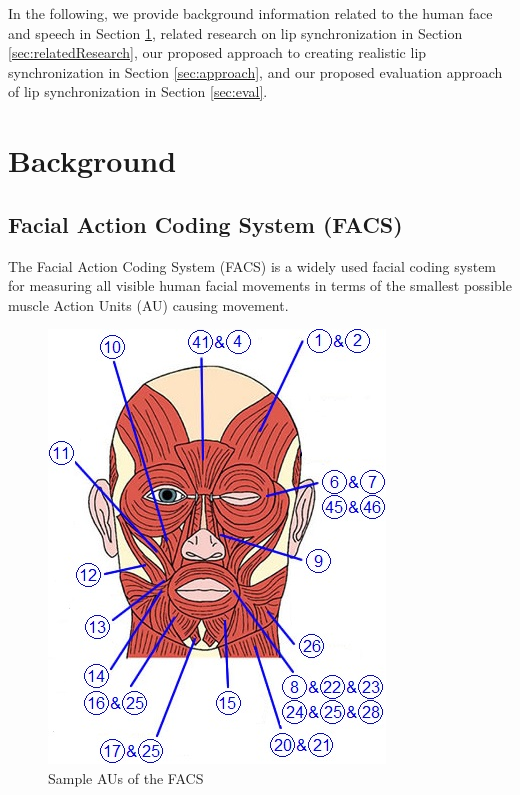 \documentclass[12pt]{article}
\begin{document}
In the following, we provide background information related to the human face and speech in Section \ref{sec:background}, related research on lip synchronization in Section \ref{sec:relatedResearch}, our proposed approach to creating realistic lip synchronization in Section \ref{sec:approach}, and our proposed evaluation approach of  lip synchronization in Section \ref{sec:eval}.
\newpage
\section{Background}
\label{sec:background}

\subsection{Facial Action Coding System (FACS)}
\label{sec:FACS}

The Facial Action Coding System (FACS) \cite{ekman1978facs} is a widely
used facial coding system for measuring all visible human facial 
movements in terms of the smallest possible muscle Action
Units (AU) causing movement. 

\begin{figure}
    \centering
    \vspace{-5mm}
    \includegraphics[width=\linewidth]{FaceMuscles-AUs.jpg}
    \caption{Sample AUs of the FACS}
    \label{fig:facs}
\end{figure}
\end{document}
